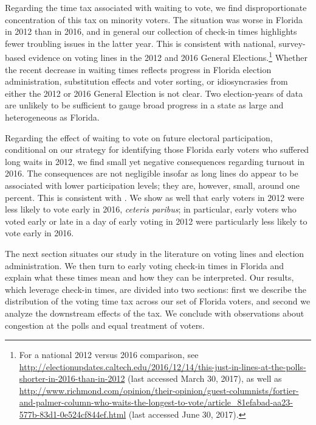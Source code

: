 \documentclass[12pt,titlepage]{article}
\begin{document}

Regarding the time tax associated with waiting to vote, we find
disproportionate concentration of this tax on minority voters.  The
situation was worse in Florida in 2012 than in 2016, and in general
our collection of check-in times highlights fewer troubling issues in
the latter year.  This is consistent with national, survey-based
evidence on voting lines in the 2012 and 2016 General
Elections.\footnote{For a national 2012 versus 2016 comparison, see
  \url{http://electionupdates.caltech.edu/2016/12/14/this-just-in-lines-at-the-polls-shorter-in-2016-than-in-2012}
  (last accessed March 30, 2017), as well as
  \url{http://www.richmond.com/opinion/their-opinion/guest-columnists/fortier-and-palmer-column-who-waits-the-longest-to-vote/article_81efabad-aa23-577b-83d1-0e524cf844ef.html}
  (last accessed June 30, 2017).}  Whether the recent decrease in
waiting times reflects progress in Florida election administration,
substitution effects and voter sorting, or idiosyncrasies from either
the 2012 or 2016 General Election is not clear.  Two election-years of
data are unlikely to be sufficient to gauge broad progress in a state
as large and heterogeneous as Florida.

Regarding the effect of waiting to vote on future electoral
participation, conditional on our strategy for identifying those
Florida early voters who suffered long waits in 2012, we find small
yet negative consequences regarding turnout in 2016. The consequences
are not negligible insofar as long lines do appear to be associated
with lower participation levels; they are, however, small, around one
percent. This is consistent with
\citet{pettigrew:longlinesminorityprecincts}.  We show as well that
early voters in 2012 were less likely to vote early in 2016,
\emph{ceteris paribus}; in particular, early voters who voted early or
late in a day of early voting in 2012 were particularly less likely to
vote early in 2016.


The next section situates our study in the literature on voting lines
and election administration.  We then turn to early voting check-in
times in Florida and explain what these times mean and how they can be
interpreted.  Our results, which leverage check-in times, are divided
into two sections: first we describe the distribution of the voting
time tax across our set of Florida voters, and second we analyze the
downstream effects of the tax.  We conclude with observations about
congestion at the polls and equal treatment of voters.
\end{document}
